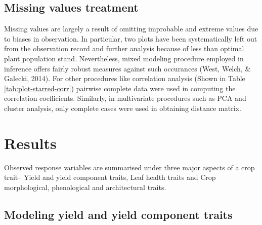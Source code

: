 \documentclass[12pt,oneside]{dukestatscithesis} %
\theoremstyle{definition}
\theoremstyle{definition}
\theoremstyle{definition}
\theoremstyle{remark}
\begin{document}
\section{Missing values treatment}\label{missing-values-treatment}

Missing values are largely a result of omitting improbable and extreme
values due to biases in observation. In particular, two plots have been
systematically left out from the observation record and further analysis
because of less than optimal plant population stand. Nevertheless, mixed
modeling procedure employed in inference offers fairly robust measures
against such occurances (West, Welch, \& Galecki, 2014). For other
procedures like correlation analysis (Shown in Table
\ref{tab:plot-starred-corr}) pairwise complete data were used in
computing the correlation coefficients. Similarly, in multivariate
procedures such as PCA and cluster analysis, only complete cases were
used in obtaining distance matrix.

\chapter{Results}\label{results}

Observed response variables are summarised under three major aspects of
a crop trait-- Yield and yield component traits, Leaf health traits and
Crop morphological, phenological and architectural traits.

\section{Modeling yield and yield component
traits}\label{modeling-yield-and-yield-component-traits}
\end{document}
